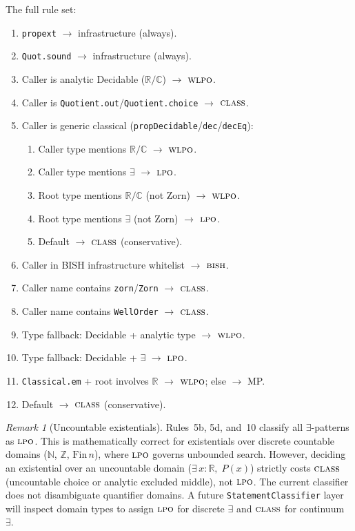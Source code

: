 \documentclass[12pt, a4paper]{article}
\theoremstyle{plain}
\theoremstyle{definition}
\theoremstyle{remark}
\newtheorem{remark}[theorem]{Remark}
\newcommand{\BISH}{\textsc{bish}}
\newcommand{\WLPO}{\textsc{wlpo}}
\newcommand{\LPO}{\textsc{lpo}}
\newcommand{\CLASS}{\textsc{class}}
\begin{document}
The full rule set:
\begin{enumerate}[nosep]
\item \texttt{propext} $\to$ infrastructure (always).
\item \texttt{Quot.sound} $\to$ infrastructure (always).
\item Caller is analytic Decidable ($\mathbb{R}/\mathbb{C}$) $\to$ $\WLPO$.
\item Caller is \texttt{Quotient.out}/\texttt{Quotient.choice} $\to$ $\CLASS$.
\item Caller is generic classical (\texttt{propDecidable}/\texttt{dec}/\texttt{decEq}):
  \begin{enumerate}[nosep]
    \item Caller type mentions $\mathbb{R}/\mathbb{C}$ $\to$ $\WLPO$.
    \item Caller type mentions $\exists$ $\to$ $\LPO$.
    \item Root type mentions $\mathbb{R}/\mathbb{C}$ (not Zorn) $\to$ $\WLPO$.
    \item Root type mentions $\exists$ (not Zorn) $\to$ $\LPO$.
    \item Default $\to$ $\CLASS$ (conservative).
  \end{enumerate}
\item Caller in BISH infrastructure whitelist $\to$ $\BISH$.
\item Caller name contains \texttt{zorn}/\texttt{Zorn} $\to$ $\CLASS$.
\item Caller name contains \texttt{WellOrder} $\to$ $\CLASS$.
\item Type fallback: Decidable + analytic type $\to$ $\WLPO$.
\item Type fallback: Decidable + $\exists$ $\to$ $\LPO$.
\item \texttt{Classical.em} + root involves $\mathbb{R}$ $\to$ $\WLPO$; else $\to$ MP.
\item Default $\to$ $\CLASS$ (conservative).
\end{enumerate}

\begin{remark}[Uncountable existentials]\label{rem:uncountable-exists}
Rules~5b, 5d, and~10 classify all $\exists$-patterns as $\LPO$.
This is mathematically correct for existentials over discrete
countable domains ($\mathbb{N}$, $\mathbb{Z}$, $\mathrm{Fin}\,n$),
where $\LPO$ governs unbounded search.  However, deciding an
existential over an uncountable domain ($\exists\,x : \mathbb{R},\;
P(x)$) strictly costs $\CLASS$ (uncountable choice or analytic
excluded middle), not $\LPO$.  The current classifier does not
disambiguate quantifier domains.  A future
\texttt{StatementClassifier} layer will inspect domain types to
assign $\LPO$ for discrete $\exists$ and $\CLASS$ for
continuum~$\exists$.
\end{remark}
\end{document}
